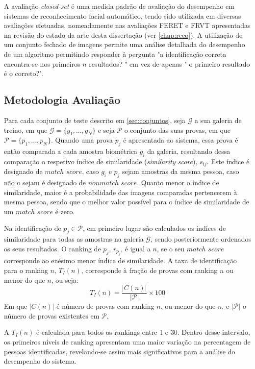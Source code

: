A avaliação \textit{closed-set} é uma medida padrão de avaliação do desempenho em sistemas de reconhecimento facial automático, tendo sido utilizada em diversas avaliações efetuadas, nomeadamente nas avaliações FERET e FRVT apresentadas na revisão do estado da arte desta dissertação (ver \ref{chap:reco}). A utilização de um conjunto fechado de imagens permite uma análise detalhada do desempenho de um algoritmo permitindo responder à pergunta "a identificação correta encontra-se nos primeiros $n$ resultados? " em vez de apenas " o primeiro resultado é o correto?".

\subsection{Metodologia Avaliação}
Para cada conjunto de teste descrito em \ref{sec:conjuntos}, seja $\mathscr{G}$ a sua galeria de treino, em que $\mathscr{G} = \{g_1, ..., g_N\}$ e seja $\mathscr{P}$ o conjunto das suas provas, em que $\mathscr{P} = \{p_1, ..., p_N\}$. Quando uma prova $p_j$ é apresentada ao sistema, essa prova é então comparada a cada amostra biométrica $g_i$ da galeria, resultando dessa comparação o respetivo índice de similaridade (\textit{similarity score}), $s_{ij}$. Este índice é designado de $match$ $score$, caso $g_i$ e $p_j$ sejam amostras da mesma pessoa, caso não o sejam é designado de $nonmatch$ $score$. Quanto menor o índice de similaridade, maior é a probabilidade das imagens comparadas pertencerem à mesma pessoa, sendo que o melhor valor possível para o índice de similaridade de um $match$ $score$ é zero.

Na identificação de $p_j \in \mathscr{P}$, em primeiro lugar são calculados os índices de similaridade para todas as amostras na galeria $\mathscr{G}$, sendo posteriormente ordenados os seus resultados. O ranking de $p_j$, $r_{p_j}$, é igual a $n$, se o seu $match$ $score$ corresponde ao enésimo menor índice de similaridade. A taxa de identificação para o ranking $n$, $T_{I}(n)$, corresponde à fração de provas com ranking $n$ ou menor do que $n$, ou seja:
\begin{equation}
T_{I}(n) = \frac{|C(n)|}{|\mathscr{P}|} \times 100
\end{equation}
Em que $|C(n)|$ é número de provas com ranking $n$, ou menor do que $n$, e $|\mathscr{P}|$ o número de provas existentes em $\mathscr{P}$.

A $T_{I}(n)$ é calculada para todos os rankings entre 1 e 30. Dentro desse intervalo, os primeiros níveis de ranking apresentam uma maior variação na percentagem de pessoas identificadas, revelando-se assim mais significativos para a análise do desempenho do sistema.

